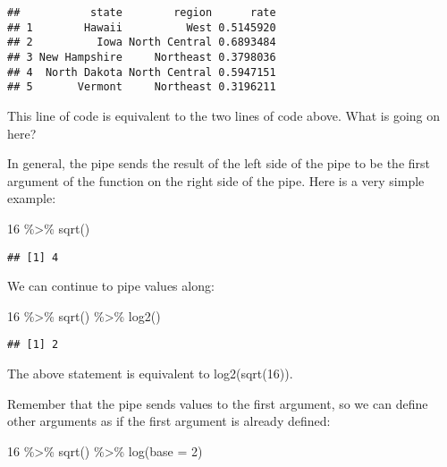 \documentclass[
]{article}
\newenvironment{Shaded}{\begin{snugshade}}{\end{snugshade}}
\newcommand{\AttributeTok}[1]{\textcolor[rgb]{0.77,0.63,0.00}{#1}}
\newcommand{\DecValTok}[1]{\textcolor[rgb]{0.00,0.00,0.81}{#1}}
\newcommand{\FunctionTok}[1]{\textcolor[rgb]{0.00,0.00,0.00}{#1}}
\newcommand{\NormalTok}[1]{#1}
\newcommand{\SpecialCharTok}[1]{\textcolor[rgb]{0.00,0.00,0.00}{#1}}
\begin{document}
\begin{verbatim}
##           state        region      rate
## 1        Hawaii          West 0.5145920
## 2          Iowa North Central 0.6893484
## 3 New Hampshire     Northeast 0.3798036
## 4  North Dakota North Central 0.5947151
## 5       Vermont     Northeast 0.3196211
\end{verbatim}

This line of code is equivalent to the two lines of code above. What is
going on here?

In general, the pipe sends the result of the left side of the pipe to be
the first argument of the function on the right side of the pipe. Here
is a very simple example:

\begin{Shaded}
\begin{Highlighting}[]
\DecValTok{16} \SpecialCharTok{\%\textgreater{}\%} \FunctionTok{sqrt}\NormalTok{()}
\end{Highlighting}
\end{Shaded}

\begin{verbatim}
## [1] 4
\end{verbatim}

We can continue to pipe values along:

\begin{Shaded}
\begin{Highlighting}[]
\DecValTok{16} \SpecialCharTok{\%\textgreater{}\%} \FunctionTok{sqrt}\NormalTok{() }\SpecialCharTok{\%\textgreater{}\%} \FunctionTok{log2}\NormalTok{()}
\end{Highlighting}
\end{Shaded}

\begin{verbatim}
## [1] 2
\end{verbatim}

The above statement is equivalent to log2(sqrt(16)).

Remember that the pipe sends values to the first argument, so we can
define other arguments as if the first argument is already defined:

\begin{Shaded}
\begin{Highlighting}[]
\DecValTok{16} \SpecialCharTok{\%\textgreater{}\%} \FunctionTok{sqrt}\NormalTok{() }\SpecialCharTok{\%\textgreater{}\%} \FunctionTok{log}\NormalTok{(}\AttributeTok{base =} \DecValTok{2}\NormalTok{)}
\end{Highlighting}
\end{Shaded}
\end{document}
